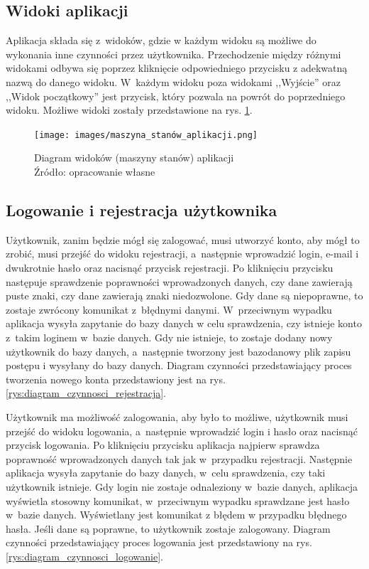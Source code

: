 \documentclass[12pt, a4paper]{article} %
\begin{document}
\subsection{Widoki aplikacji}
\aka Aplikacja składa się z~widoków, gdzie w każdym widoku są możliwe do wykonania inne czynności przez użytkownika. Przechodzenie między różnymi widokami odbywa się poprzez kliknięcie odpowiedniego przycisku z adekwatną nazwą do danego widoku. W~każdym widoku poza widokami ,,Wyjście'' oraz ,,Widok początkowy'' jest przycisk, który pozwala na powrót do poprzedniego widoku. Możliwe widoki zostały przedstawione na rys. \ref{rys:diagram_maszyny_stanów}.


\begin{figure}[h]
	\centering
	\texttt{[image: images/maszyna\_stanów\_aplikacji.png]}
	\caption{Diagram widoków (maszyny stanów) aplikacji \\ Źródło: opracowanie własne}
	\label{rys:diagram_maszyny_stanów}
\end{figure}

\subsection{Logowanie i rejestracja użytkownika}
\aka Użytkownik, zanim będzie mógł się zalogować, musi utworzyć konto, aby mógł to zrobić, musi przejść do widoku rejestracji, a~następnie wprowadzić login, e-mail i dwukrotnie hasło oraz nacisnąć przycisk rejestracji. Po kliknięciu przycisku następuje sprawdzenie poprawności wprowadzonych danych, czy dane zawierają puste znaki, czy dane zawierają znaki niedozwolone. Gdy dane są niepoprawne, to zostaje zwrócony komunikat z~błędnymi danymi. W~przeciwnym wypadku aplikacja wysyła zapytanie do bazy danych w celu sprawdzenia, czy istnieje konto z~takim loginem w~bazie danych. Gdy nie istnieje, to zostaje dodany nowy użytkownik do bazy danych, a~następnie tworzony jest bazodanowy plik zapisu postępu i wysyłany do bazy danych.
Diagram czynności przedstawiający proces tworzenia nowego konta przedstawiony jest na rys. \ref{rys:diagram_czynnosci_rejestracja}.

\aka Użytkownik ma możliwość zalogowania, aby było to możliwe, użytkownik musi przejść do widoku logowania, a~następnie wprowadzić login i hasło oraz nacisnąć przycisk logowania. Po kliknięciu przycisku aplikacja najpierw sprawdza poprawność wprowadzonych danych tak jak w~przypadku rejestracji. Następnie aplikacja wysyła zapytanie do bazy danych, w~celu sprawdzenia, czy taki użytkownik istnieje. Gdy login nie zostaje odnaleziony w~bazie danych, aplikacja wyświetla stosowny komunikat, w~przeciwnym wypadku sprawdzane jest hasło w~bazie danych. Wyświetlany jest komunikat z błędem w przypadku błędnego hasła. Jeśli dane są poprawne, to użytkownik zostaje zalogowany. Diagram czynności przedstawiający proces logowania jest przedstawiony na rys. \ref{rys:diagram_czynnosci_logowanie}.
\end{document}
